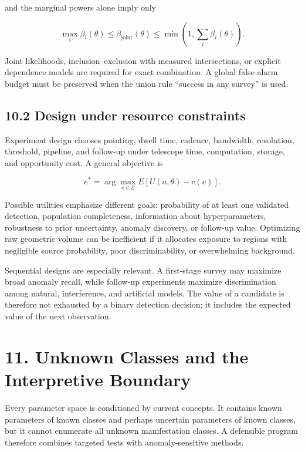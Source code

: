 \documentclass[11pt,a4paper]{article}
\begin{document}
and the marginal powers alone imply only

\begin{equation}
\max_i\beta_i(\theta)
\le\beta_{\mathrm{joint}}(\theta)
\le\min\!\left(1,\sum_i\beta_i(\theta)\right).
\end{equation}

Joint likelihoods, inclusion--exclusion with measured intersections, or explicit dependence models are required for exact combination. A global false-alarm budget must be preserved when the union rule ``success in any survey'' is used.

\subsection{10.2 Design under resource constraints}\label{102-design-under-resource-constraints}

Experiment design chooses pointing, dwell time, cadence, bandwidth, resolution, threshold, pipeline, and follow-up under telescope time, computation, storage, and opportunity cost. A general objective is

\begin{equation}
e^*=\arg\max_{e\in\mathcal E}
E[U(a,\theta)-c(e)].
\end{equation}

Possible utilities emphasize different goals: probability of at least one validated detection, population completeness, information about hyperparameters, robustness to prior uncertainty, anomaly discovery, or follow-up value. Optimizing raw geometric volume can be inefficient if it allocates exposure to regions with negligible source probability, poor discriminability, or overwhelming background.

Sequential designs are especially relevant. A first-stage survey may maximize broad anomaly recall, while follow-up experiments maximize discrimination among natural, interference, and artificial models. The value of a candidate is therefore not exhausted by a binary detection decision; it includes the expected value of the next observation.

\section{11. Unknown Classes and the Interpretive Boundary}\label{11-unknown-classes-and-the-interpretive-boundary}

Every parameter space is conditioned by current concepts. It contains known parameters of known classes and perhaps uncertain parameters of known classes, but it cannot enumerate all unknown manifestation classes. A defensible program therefore combines targeted tests with anomaly-sensitive methods.
\end{document}
